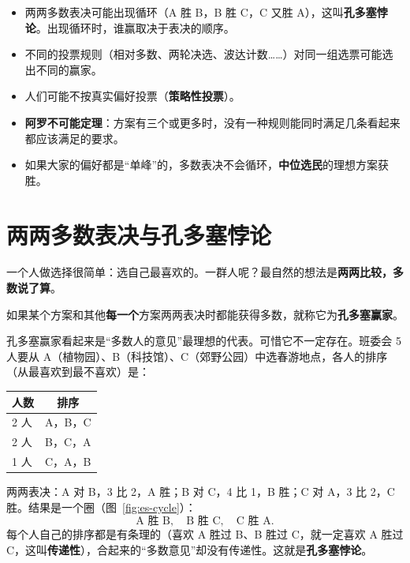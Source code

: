 
\begin{keypoints}
\begin{itemize}
  \item 两两多数表决可能出现循环（A 胜 B，B 胜 C，C 又胜 A），这叫\textbf{孔多塞悖论}。出现循环时，谁赢取决于表决的顺序。
  \item 不同的投票规则（相对多数、两轮决选、波达计数……）对同一组选票可能选出不同的赢家。
  \item 人们可能不按真实偏好投票（\textbf{策略性投票}）。
  \item \textbf{阿罗不可能定理}：方案有三个或更多时，没有一种规则能同时满足几条看起来都应该满足的要求。
  \item 如果大家的偏好都是“单峰”的，多数表决不会循环，\textbf{中位选民}的理想方案获胜。
\end{itemize}
\end{keypoints}

\section{两两多数表决与孔多塞悖论}

一个人做选择很简单：选自己最喜欢的。一群人呢？最自然的想法是\textbf{两两比较，多数说了算}。

\begin{definition}[孔多塞赢家]
如果某个方案和其他\textbf{每一个}方案两两表决时都能获得多数，就称它为\textbf{孔多塞赢家}。
\end{definition}

孔多塞赢家看起来是“多数人的意见”最理想的代表。可惜它不一定存在。班委会 5 人要从 A（植物园）、B（科技馆）、C（郊野公园）中选春游地点，各人的排序（从最喜欢到最不喜欢）是：
\begin{center}
\small
\begin{tabular}{lc}
  \toprule
  人数 & 排序 \\
  \midrule
  2 人 & A，B，C \\
  2 人 & B，C，A \\
  1 人 & C，A，B \\
  \bottomrule
\end{tabular}
\end{center}
两两表决：A 对 B，3 比 2，A 胜；B 对 C，4 比 1，B 胜；C 对 A，3 比 2，C 胜。结果是一个圈（图~\ref{fig:es-cycle}）：
\[
  \text{A 胜 B},\quad \text{B 胜 C},\quad \text{C 胜 A}.
\]
每个人自己的排序都是有条理的（喜欢 A 胜过 B、B 胜过 C，就一定喜欢 A 胜过 C，这叫\textbf{传递性}），合起来的“多数意见”却没有传递性。这就是\textbf{孔多塞悖论}。

